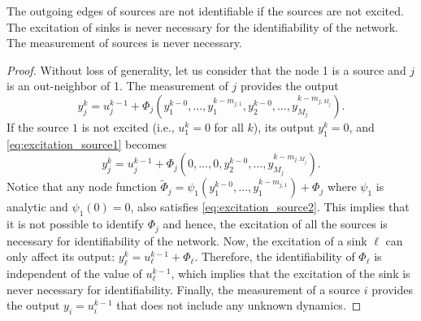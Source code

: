 \documentclass[10pt,a4paper]{amsart}
\begin{document}
\begin{lemma}\label{lemma:sinks_sources}
    The outgoing edges of sources are not identifiable if the sources are not excited. The excitation of sinks is never necessary for the identifiability of the network. The measurement of sources is never necessary.
\end{lemma}

\begin{proof}
Without loss of generality, let us consider that the node 1 is a source and $j$ is an out-neighbor of 1.
    The measurement of $j$ provides the output
    \begin{equation}\label{eq:excitation_source1}
        y_j^k=u_j^{k-1}+\Phi_j(y_1^{k-0},\ldots,y_1^{k-m_{j,1}},y_2^{k-0},\ldots,y_{M_j}^{k-m_{j,M_j}}).    
    \end{equation}
    If the source $1$ is not excited (i.e., $u_1^k=0$ for all $k$), its output $y_1^k=0$, and   \eqref{eq:excitation_source1} becomes
    \begin{equation}\label{eq:excitation_source2}
        y_j^k=u_j^{k-1}+\Phi_j(0,\ldots,0,y_2^{k-0},\ldots,y_{M_j}^{k-m_{j,M_j}}).  
    \end{equation}
    Notice that any node function $\tilde \Phi_j=\psi_1(y_1^{k-0},\ldots,y_1^{k-m_{j,1}})+\Phi_j$ where $\psi_1$ is analytic and  $\psi_1(0)=0$, also satisfies \eqref{eq:excitation_source2}. This implies that it is not possible to identify $\Phi_j$ and hence, the excitation of all the sources is necessary for identifiability of the network.
    Now, the excitation of a sink $\ell$ can only affect its output:
    $y_\ell^k=u_\ell^{k-1}+\Phi_\ell$. Therefore,
    the identifiability of $\Phi_\ell$ is independent of the value of $u_\ell^{k-1}$, which implies that the excitation of the sink is never necessary for identifiability.
Finally, the measurement of a source $i$ provides the output $y_i=u_i^{k-1}$ that does not include any unknown dynamics.
\end{proof}
\end{document}
